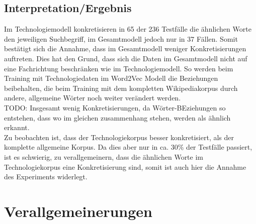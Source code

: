 \documentclass[12pt,a4paper]{report}
\begin{document}
		
		\subsection*{Interpretation/Ergebnis}
Im Technologiemodell konkretisieren in 65 der 236 Testfälle	die ähnlichen Worte den jeweiligen Suchbegriff, im Gesamtmodell jedoch nur in 37 Fällen. Somit bestätigt sich die Annahme, dass im Gesamtmodell weniger Konkretisierungen auftreten. Dies hat den Grund, dass sich die Daten im Gesamtmodell nicht auf eine Fachrichtung beschränken wie im Technologiemodell. So werden beim Training mit Technologiedaten im Word2Vec Modell die Beziehungen beibehalten, die beim Training mit dem kompletten Wikipediakorpus durch andere, allgemeine Wörter noch weiter verändert werden. \\

TODO: Insgesamt wenig Konkretisierungen, da Wörter-BEziehungen so entstehen, dass wo im gleichen zusammenhang stehen, werden als ähnlich erkannt.\\

		
		Zu beobachten ist, dass der Technologiekorpus besser konkretisiert, als der komplette allgemeine Korpus. Da dies aber nur in ca. 30\% der Testfälle passiert, ist es schwierig, zu verallgemeinern, dass die ähnlichen Worte im Technologiekorpus eine Konkretisierung sind, somit ist auch hier die Annahme des Experiments widerlegt.\\
		
		
	
	\section{Verallgemeinerungen}
\end{document}
